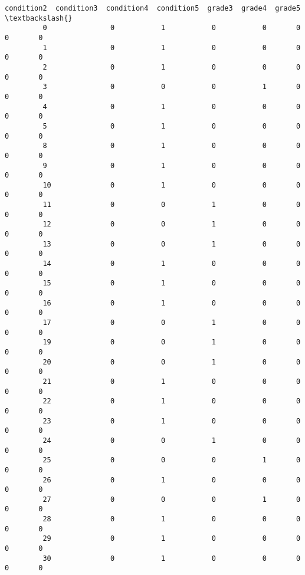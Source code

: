 \documentclass[11pt]{article}
\begin{document}
\begin{Verbatim}[commandchars=\\\{\}]
                condition2  condition3  condition4  condition5  grade3  grade4  grade5  \textbackslash{}
         0               0           1           0           0       0       0       0   
         1               0           1           0           0       0       0       0   
         2               0           1           0           0       0       0       0   
         3               0           0           0           1       0       0       0   
         4               0           1           0           0       0       0       0   
         5               0           1           0           0       0       0       0   
         8               0           1           0           0       0       0       0   
         9               0           1           0           0       0       0       0   
         10              0           1           0           0       0       0       0   
         11              0           0           1           0       0       0       0   
         12              0           0           1           0       0       0       0   
         13              0           0           1           0       0       0       0   
         14              0           1           0           0       0       0       0   
         15              0           1           0           0       0       0       0   
         16              0           1           0           0       0       0       0   
         17              0           0           1           0       0       0       0   
         19              0           0           1           0       0       0       0   
         20              0           0           1           0       0       0       0   
         21              0           1           0           0       0       0       0   
         22              0           1           0           0       0       0       0   
         23              0           1           0           0       0       0       0   
         24              0           0           1           0       0       0       0   
         25              0           0           0           1       0       0       0   
         26              0           1           0           0       0       0       0   
         27              0           0           0           1       0       0       0   
         28              0           1           0           0       0       0       0   
         29              0           1           0           0       0       0       0   
         30              0           1           0           0       0       0       0   

\end{Verbatim}
\end{document}
